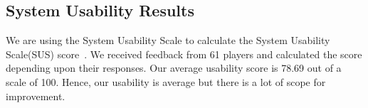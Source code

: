 \subsection{System Usability Results}
We are using the System Usability Scale to calculate the System Usability Scale(SUS) score~\cite{JBrookeSUS}. We received feedback from 61 players and calculated the score depending upon their responses. Our average usability score is 78.69 out of a scale of 100. Hence, our usability is average but there is a lot of scope for improvement.








